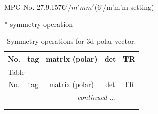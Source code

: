 \documentclass[fleqn,8pt]{jsarticle}
\begin{document}
\setcounter{MaxMatrixCols}{32}

\renewcommand{\tablename}{Table~}
\renewcommand{\figurename}{Figure~}
\begin{center}
\LARGE
MPG No. 27.9.157\quad$6'/m'mm'$\quad(6'/m'm'm setting)
\end{center}
* symmetry operation
\renewcommand{\arraystretch}{1.3}
\begin{longtable}{ccccc}
\caption{Symmetry operations for 3d polar vector.}
 \\
 \hline \hline
No. & tag & matrix (polar) & det & TR \\ \hline \endfirsthead

\multicolumn{4}{l}{\tablename\ \thetable{}} \\
 \hline \hline
No. & tag & matrix (polar) & det & TR \\ \hline \endhead

 \hline \hline
\multicolumn{4}{r}{\footnotesize\it continued ...} \\ \endfoot

 \hline \hline
\multicolumn{4}{r}{} \\ \endlastfoot


\end{longtable}
\end{document}
